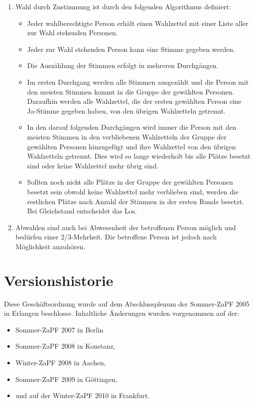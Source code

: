 \documentclass[draft,12pt,oneside]{scrreprt}
\begin{document}
\begin{enumerate}
  \item Wahl durch Zustimmung ist durch den folgenden Algorithmus definiert:
        \begin{itemize}
        \item Jeder wahlberechtigte Person erhält einen Wahlzettel mit einer
              Liste aller zur Wahl stehenden Personen.
        \item Jeder zur Wahl stehenden Person kann eine Stimme gegeben werden.
        \item Die Auszählung der Stimmen erfolgt in mehreren Durchgängen.
        \item Im ersten Durchgang werden alle Stimmen ausgezählt und die Person
              mit den meisten Stimmen kommt in die Gruppe der gewählten Personen.
              Daraufhin werden alle Wahlzettel, die der ersten gewählten Person
              eine Ja-Stimme gegeben haben, von den übrigen Wahlzetteln getrennt.
        \item In den darauf folgenden Durchgängen wird immer die Person mit den
              meisten Stimmen in den verbliebenen Wahlzetteln der Gruppe der gewählten
              Personen hinzugefügt und ihre Wahlzettel von den übrigen Wahlzetteln
              getrennt. Dies wird so lange wiederholt bis alle Plätze besetzt sind
              oder keine Wahlzettel mehr übrig sind.
        \item Sollten noch nicht alle Plätze in der Gruppe der gewählten Personen
              besetzt sein obwohl keine Wahlzettel mehr verblieben sind, werden
              die restlichen Plätze nach Anzahl der Stimmen in der ersten Runde
              besetzt. Bei Gleichstand entscheidet das Los.
        \end{itemize}

  \item Abwahlen sind auch bei Abwesenheit der betroffenen Person möglich und
        bedürfen einer 2/3-Mehrheit.
        Die betroffene Person ist jedoch nach Möglichkeit anzuhören.
\end{enumerate}

\section*{Versionshistorie}

Diese Geschäftsordnung wurde auf dem Abschlussplenum der Sommer-ZaPF 2005 in
Erlangen beschlosse.
Inhaltliche Änderungen wurden vorgenommen auf der:

\begin{itemize}

  \item Sommer-ZaPF 2007 in Berlin

  \item Sommer-ZaPF 2008 in Konstanz,

  \item Winter-ZaPF 2008 in Aachen,

  \item Sommer-ZaPF 2009 in Göttingen,

  \item und auf der Winter-ZaPF 2010 in Frankfurt.

\end{itemize}
\end{document}
